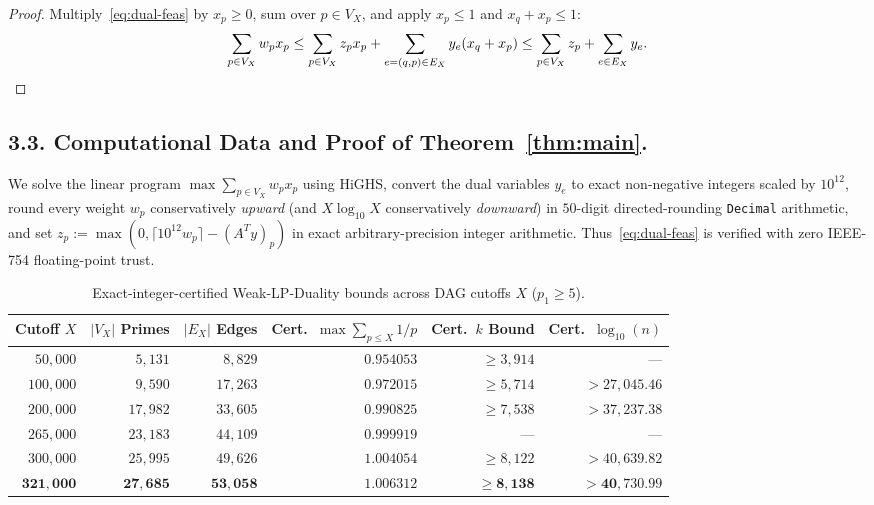 \documentclass[11pt]{amsart}
\theoremstyle{definition}
\theoremstyle{remark}
\numberwithin{equation}{section}
\begin{document}
\begin{proof}
Multiply~\eqref{eq:dual-feas} by $x_p \ge 0$, sum over $p \in V_X$, and apply $x_p \le 1$ and $x_q + x_p \le 1$:
\[
    \sum_{p \in V_X} w_p x_p \le \sum_{p \in V_X} z_p x_p + \sum_{e=(q,p) \in E_X} y_e (x_q + x_p) \le \sum_{p \in V_X} z_p + \sum_{e \in E_X} y_e. \qedhere
\]
\end{proof}

\subsection*{3.3. Computational Data and Proof of Theorem~\ref{thm:main}.}
We solve the linear program $\max \sum_{p \in V_X} w_p x_p$ using HiGHS, convert the dual variables $y_e$ to exact non-negative integers scaled by $10^{12}$, round every weight $w_p$ conservatively \emph{upward} (and $X \log_{10} X$ conservatively \emph{downward}) in $50$-digit directed-rounding \texttt{Decimal} arithmetic, and set $z_p := \max(0, \lceil 10^{12} w_p \rceil - (A^T y)_p)$ in exact arbitrary-precision integer arithmetic. Thus~\eqref{eq:dual-feas} is verified with zero IEEE-754 floating-point trust.

\begin{table}[h]
\centering
\caption{Exact-integer-certified Weak-LP-Duality bounds across DAG cutoffs $X$ ($p_1 \ge 5$).}
\label{tab:lp-data}
\begin{tabular}{@{}rrrrrr@{}}
\hline\hline
Cutoff $X$ & $|V_X|$ Primes & $|E_X|$ Edges & Cert.\ $\max \sum_{p \le X} 1/p$ & Cert.\ $k$ Bound & Cert.\ $\log_{10}(n)$ \\
\hline
$50{,}000$  & $5{,}131$  & $8{,}829$  & $0.954053$ & $\ge 3{,}914$ & — \\
$100{,}000$ & $9{,}590$  & $17{,}263$ & $0.972015$ & $\ge 5{,}714$ & $> 27{,}045.46$ \\
$200{,}000$ & $17{,}982$ & $33{,}605$ & $0.990825$ & $\ge 7{,}538$ & $> 37{,}237.38$ \\
$265{,}000$ & $23{,}183$ & $44{,}109$ & $0.999919$ & —             & — \\
$300{,}000$ & $25{,}995$ & $49{,}626$ & $1.004054$ & $\ge 8{,}122$ & $> 40{,}639.82$ \\
$\mathbf{321{,}000}$ & $\mathbf{27{,}685}$ & $\mathbf{53{,}058}$ & $1.006312$ & $\mathbf{\ge 8{,}138}$ & $\mathbf{> 40{,}730.99}$ \\
\hline\hline
\end{tabular}
\end{table}
\end{document}
